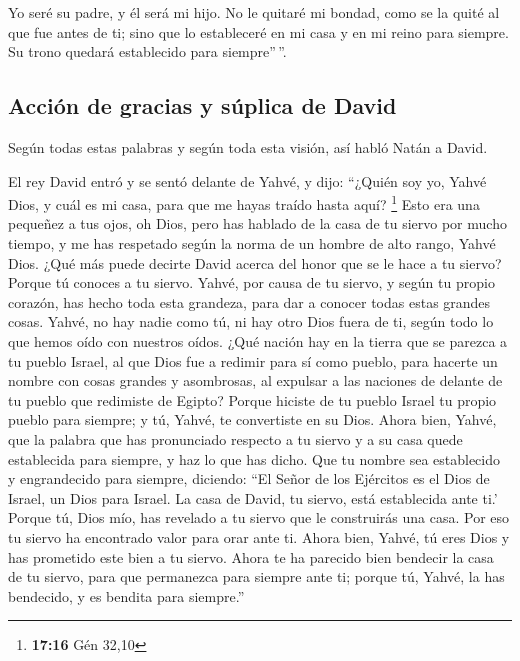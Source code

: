  Yo seré su padre, y él será mi hijo. No le quitaré mi
bondad, como se la quité al que fue antes de ti;  sino
que lo estableceré en mi casa y en mi reino para siempre. Su trono
quedará establecido para siempre''\,''.

\hypertarget{acciuxf3n-de-gracias-y-suxfaplica-de-david}{%
\subsection{Acción de gracias y súplica de
David}\label{acciuxf3n-de-gracias-y-suxfaplica-de-david}}

 Según todas estas palabras y según toda esta visión, así
habló Natán a David.

 El rey David entró y se sentó delante de Yahvé, y dijo:
``¿Quién soy yo, Yahvé Dios, y cuál es mi casa, para que me hayas traído
hasta aquí? \footnote{\textbf{17:16} Gén 32,10}  Esto era
una pequeñez a tus ojos, oh Dios, pero has hablado de la casa de tu
siervo por mucho tiempo, y me has respetado según la norma de un hombre
de alto rango, Yahvé Dios.  ¿Qué más puede decirte David
acerca del honor que se le hace a tu siervo? Porque tú conoces a tu
siervo.  Yahvé, por causa de tu siervo, y según tu propio
corazón, has hecho toda esta grandeza, para dar a conocer todas estas
grandes cosas.  Yahvé, no hay nadie como tú, ni hay otro
Dios fuera de ti, según todo lo que hemos oído con nuestros oídos.
 ¿Qué nación hay en la tierra que se parezca a tu pueblo
Israel, al que Dios fue a redimir para sí como pueblo, para hacerte un
nombre con cosas grandes y asombrosas, al expulsar a las naciones de
delante de tu pueblo que redimiste de Egipto?  Porque
hiciste de tu pueblo Israel tu propio pueblo para siempre; y tú, Yahvé,
te convertiste en su Dios.  Ahora bien, Yahvé, que la
palabra que has pronunciado respecto a tu siervo y a su casa quede
establecida para siempre, y haz lo que has dicho.  Que tu
nombre sea establecido y engrandecido para siempre, diciendo: ``El Señor
de los Ejércitos es el Dios de Israel, un Dios para Israel. La casa de
David, tu siervo, está establecida ante ti.'  Porque tú,
Dios mío, has revelado a tu siervo que le construirás una casa. Por eso
tu siervo ha encontrado valor para orar ante ti.  Ahora
bien, Yahvé, tú eres Dios y has prometido este bien a tu siervo.
 Ahora te ha parecido bien bendecir la casa de tu siervo,
para que permanezca para siempre ante ti; porque tú, Yahvé, la has
bendecido, y es bendita para siempre.''

